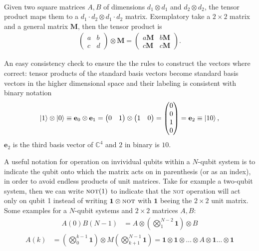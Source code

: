 \begin{def*}\phantom{,,,}\\
Given two square matrices $A,B$ of dimensions $d_1\otimes d_1$ and $d_2\otimes d_2$, the tensor product maps them to a $d_1\cdot d_2 \otimes d_1\cdot d_2$ matrix.
Exemplatory take a $2\times 2$ matrix and a general matrix $\mathbf{M}$, then the tensor product is
    \begin{align}
    \begin{pmatrix}
        a & b \\
        c & d 
    \end{pmatrix} \otimes \mathbf{M}
    = \begin{pmatrix}
        a \mathbf{M} & b \mathbf{M} \\
        c \mathbf{M} & c \mathbf{M}
    \end{pmatrix}.
\end{align}
\end{def*}

An easy consistency check to ensure the the rules to construct the vectors where correct: tensor products of the standard basis vectors become standard basis vectors in the higher dimensional space and their labeling is consistent with binary notation
\begin{align}
    \ket{1}\otimes\ket{0} \equiv \mathbf{e}_0 \otimes \mathbf{e}_1 = \begin{pmatrix} 0 & 1\end{pmatrix} \otimes \begin{pmatrix} 1 & 0 \end{pmatrix} = \begin{pmatrix} 0 \\ 0 \\ 1 \\ 0\end{pmatrix} = \mathbf{e}_2 \equiv \ket{10},
\end{align}
$\mathbf{e}_2$ is the third basis vector of $\mathbb{C}^4$ and $2$ in binary is $10$.

A useful notation for operation on invividual qubits within a $N$-qubit system is to indicate the qubit onto which the matrix acts on in parenthesis (or as an index), in order to avoid endless products of unit matrices. Take for example a two-qubit system, then we can write $\textsc{not}(1)$ to indicate that the 
\textsc{not} operation will act only on qubit 1 instead of writing $\mathbf{1}\otimes \textsc{not}$ with $\mathbf{1}$ beeing the $2\times2$ unit matrix. Some examples for a $N$-qubit systems and $2\times 2$ matrices $A,B$:
\begin{align}
    A(0)B(N-1) &= A \otimes \left(\bigotimes_{1}^{N-2} \mathbf{1}\right) \otimes B
\end{align}
\begin{align}
    A(k) &= \left(\bigotimes_0^{k-1} \mathbf{1} \right)\otimes M \left(\bigotimes_{k+1}^{N-1} \mathbf{1}\right) = \mathbf{1} \otimes \mathbf{1} \otimes \dots \otimes A \otimes \mathbf{1} \dots \otimes \mathbf{1}
\end{align}

